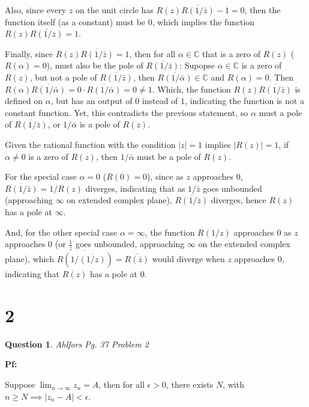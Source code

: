 \documentclass{article}
\newtheorem{question}{Question}
\begin{document}
Also, since every $z$ on the unit circle has $R(z)\overline{R(1/\bar{z})}-1=0$, then the function itself (as a constant) must be $0$, which implies the function $R(z)\overline{R(1/\bar{z})}=1$.

\hfill

Finally, since $R(z)\overline{R(1/\bar{z})}=1$, then for all $\alpha\in\mathbb{C}$ that is a zero of $R(z)$ ($R(\alpha)=0$), must also be the pole of $\overline{R(1/\bar{z})}$:
Supopse $\alpha\in\mathbb{C}$ is a zero of $R(z)$, but not a pole of $\overline{R(1/\bar{z})}$, then $\overline{R(1/\bar{\alpha})}\in\mathbb{C}$ and $R(\alpha)=0$. Then $R(\alpha)\overline{R(1/\bar{\alpha})}=0\cdot\overline{R(1/\bar{\alpha})} = 0 \neq 1$.
Which, the function $R(z)\overline{R(1/\bar{z})}$ is defined on $\alpha$, but has an output of $0$ instead of $1$, indicating the function is not a constant function.
Yet, this contradicts the previous statement, so $\alpha$ must a pole of $\overline{R(1/\bar{z})}$, or $1/\bar{\alpha}$ is a pole of $R(z)$.

\hfill

Given the rational function with the condition $|z|=1$ implies $|R(z)|=1$, if $\alpha\neq 0$ is a zero of $R(z)$, then $1/\bar{\alpha}$ must be a pole of $R(z)$.

For the special case $\alpha=0$ ($R(0)=0$), since as $z$ approaches $0$, $\overline{R(1/\bar{z})}=1/R(z)$ diverges, indicating that as $1/\bar{z}$ goes unbounded (approaching $\infty$ on extended complex plane),
$\overline{R(1/\bar{z})}$ diverges, hence $R(z)$ has a pole at $\infty$.

And, for the other special case $\alpha=\infty$, the function $R(1/z)$ approaches $0$ as $z$ approaches $0$ (or $\frac{1}{z}$ goes unbounded, approaching $\infty$ on the extended complex plane),
which $\overline{R(1/\overline{(1/z)})} = \overline{R(\bar{z})}$ would diverge when $z$ approaches $0$, indicating that $R(z)$ has a pole at $0$.

\hfill

\section*{2}
\begin{question}
    Ahlfors Pg. 37 Problem 2
\end{question}

\textbf{Pf:}

Suppose $\lim_{n\rightarrow\infty}z_n=A$, then for all $\epsilon>0$, there exists $N$, with $n\geq N\implies |z_n-A|<\epsilon$.
\end{document}
